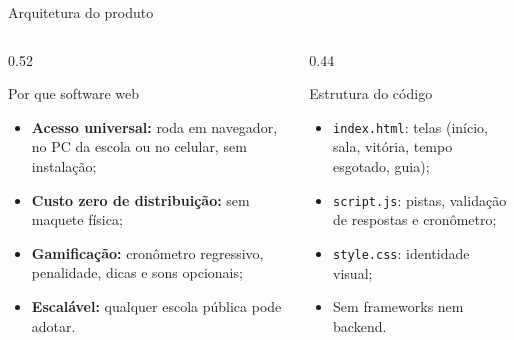 \documentclass[aspectratio=169, 10pt, t]{beamer}
\begin{document}
\begin{frame}{Arquitetura do produto}
  \begin{columns}[T]
    \begin{column}{0.52\textwidth}
      \begin{card}{Por que software web}
        \begin{itemize}
          \item \textbf{Acesso universal:} roda em navegador, no PC da escola ou no celular, sem instalação;
          \item \textbf{Custo zero de distribuição:} sem maquete física;
          \item \textbf{Gamificação:} cronômetro regressivo, penalidade, dicas e sons opcionais;
          \item \textbf{Escalável:} qualquer escola pública pode adotar.
        \end{itemize}
      \end{card}
    \end{column}
    \begin{column}{0.44\textwidth}
      \begin{card}{Estrutura do código}
        \begin{itemize}
          \item \texttt{index.html}: telas (início, sala, vitória, tempo esgotado, guia);
          \item \texttt{script.js}: pistas, validação de respostas e cronômetro;
          \item \texttt{style.css}: identidade visual;
          \item Sem frameworks nem backend.
        \end{itemize}
      \end{card}
    \end{column}
  \end{columns}
\end{frame}
\end{document}
